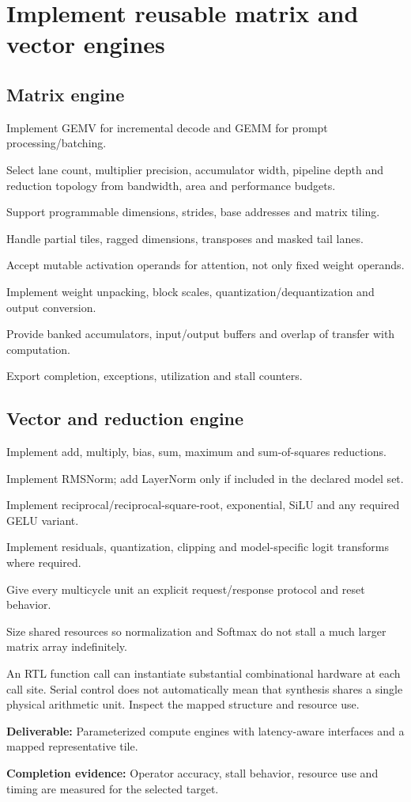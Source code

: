\documentclass[11pt,a4paper]{article}
\newcommand{\phase}[2]{\clearpage\section{#1}\label{#2}}
\newcommand{\deliver}[2]{\begin{tcolorbox}[colback=pale,colframe=line,boxrule=0.5pt,arc=1mm,left=8pt,right=8pt,top=6pt,bottom=6pt]\textbf{Deliverable:} #1\par\textbf{Completion evidence:} #2\end{tcolorbox}}
\begin{document}
\phase{Implement reusable matrix and vector engines}{sec:compute}
\subsection*{Matrix engine}
\begin{checklist}
\item Implement GEMV for incremental decode and GEMM for prompt processing/batching.
\item Select lane count, multiplier precision, accumulator width, pipeline depth
and reduction topology from bandwidth, area and performance budgets.
\item Support programmable dimensions, strides, base addresses and matrix tiling.
\item Handle partial tiles, ragged dimensions, transposes and masked tail lanes.
\item Accept mutable activation operands for attention, not only fixed weight operands.
\item Implement weight unpacking, block scales, quantization/dequantization and output conversion.
\item Provide banked accumulators, input/output buffers and overlap of transfer with computation.
\item Export completion, exceptions, utilization and stall counters.
\end{checklist}
\subsection*{Vector and reduction engine}
\begin{checklist}
\item Implement add, multiply, bias, sum, maximum and sum-of-squares reductions.
\item Implement RMSNorm; add LayerNorm only if included in the declared model set.
\item Implement reciprocal/reciprocal-square-root, exponential, SiLU and any required GELU variant.
\item Implement residuals, quantization, clipping and model-specific logit transforms where required.
\item Give every multicycle unit an explicit request/response protocol and reset behavior.
\item Size shared resources so normalization and Softmax do not stall a much larger matrix array indefinitely.
\end{checklist}
An RTL function call can instantiate substantial combinational hardware at each
call site. Serial control does not automatically mean that synthesis shares a
single physical arithmetic unit. Inspect the mapped structure and resource use.
\deliver{Parameterized compute engines with latency-aware interfaces and a mapped
representative tile.}{Operator accuracy, stall behavior, resource use and timing
are measured for the selected target.}
\end{document}
